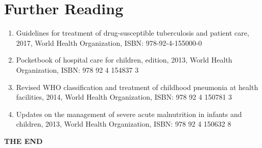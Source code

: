 \documentclass[11pt,a4paper]{report}
\begin{document}
\chapter{Further Reading}
\begin{enumerate}
	\item Guidelines for treatment of drug-susceptible tuberculosis and patient care, 
	2017, World Health Organization, 
	ISBN: 978-92-4-155000-0
	\item Pocketbook of hospital care for children, 
	 edition, 2013, World Health Organization, 
	ISBN: 978 92 4 154837 3
	\item Revised WHO classification and treatment of childhood pneumonia at health facilities, 
	2014, World Health Organization, 
	ISBN: 978 92 4 150781 3
	\item Updates on the management of severe acute malnutrition in infants and children, 
	2013, World Health Organization, 
	ISBN: 978 92 4 150632 8
\end{enumerate}





\printindex


\newpage
\clearpage
\begin{center}
	\thispagestyle{empty}
	\vspace*{\fill}
	{\huge \textbf{THE END}}
	\vspace*{\fill}
\end{center}
\clearpage


\end{document}
